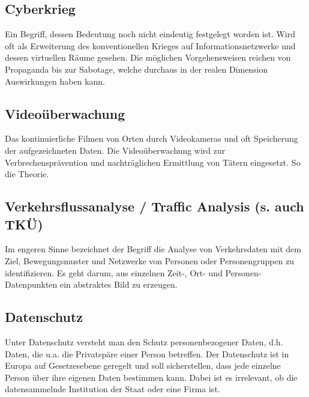 \subsection*{
Cyberkrieg 
}
Ein Begriff, dessen Bedeutung noch nicht eindeutig festgelegt worden 
ist. Wird oft als Erweiterung des konventionellen Krieges auf 
Informationsnetzwerke und dessen virtuellen R\"aume gesehen. Die 
m\"oglichen Vorgehensweisen reichen von Propaganda bis zur Sabotage, 
welche durchaus in der realen Dimension Auswirkungen haben kann. 

\subsection*{
Video\"uberwachung 
}
Das kontinuierliche Filmen von Orten durch Videokameras und oft 
Speicherung der aufgezeichneten Daten. Die Video\"uberwachung wird zur 
Verbrechenspr\"avention und nachtr\"aglichen Ermittlung von T\"atern 
eingesetzt. So die Theorie. 

\subsection*{
Verkehrsflussanalyse / Traffic Analysis (s. auch TK\"U) 
}
Im engeren Sinne bezeichnet der Begriff die Analyse von Verkehrsdaten 
mit dem Ziel, Bewegungsmuster und Netzwerke von Personen oder 
Personengruppen zu identifizieren. Es geht darum, aus einzelnen Zeit-, 
Ort- und Personen-Datenpunkten ein abstraktes Bild zu erzeugen. 

\subsection*{
Datenschutz 
}
Unter Datenschutz versteht man den Schutz personenbezogener Daten, d.h. 
Daten, die u.a. die Privatsp\"are einer Person betreffen. Der 
Datenschutz ist in Europa auf Gesetzesebene geregelt und soll 
sicherstellen, dass jede einzelne Person \"uber ihre eigenen Daten 
bestimmen kann. Dabei ist es irrelevant, ob die datensammelnde 
Institution der Staat oder eine Firma ist. 
